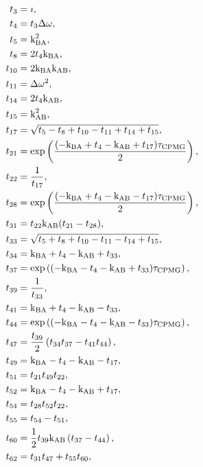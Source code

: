 \begin{subequations}
\renewcommand{\theequation}{\theparentequation .\arabic{equation}}
\begin{align}
      t_{3} &= \imath, \\
      t_{4} &= t_{3} \dw, \\
      t_{5} &= \kBA^2, \\
      t_{8} &= 2 t_{4} \kBA, \\
     t_{10} &= 2 \kBA \kAB, \\
     t_{11} &= \dw^2, \\
     t_{14} &= 2 t_{4} \kAB, \\
     t_{15} &= \kAB^2, \\
     t_{17} &= \sqrt{t_{5} - t_{8} + t_{10} - t_{11} + t_{14} + t_{15}}, \\
     t_{21} &= \exp \left(\frac{(-\kBA + t_{4} - \kAB + t_{17}) \taucpmg}{2} \right), \\
     t_{22} &= \frac{1}{t_{17}}, \\
     t_{28} &= \exp \left(\frac{(-\kBA + t_{4} - \kAB - t_{17}) \taucpmg}{2} \right), \\
     t_{31} &= t_{22} \kAB (t_{21} - t_{28}), \\
     t_{33} &= \sqrt{t_{5} + t_{8} + t_{10} - t_{11} - t_{14} + t_{15}}, \\
     t_{34} &= \kBA + t_{4} - \kAB + t_{33}, \\
     t_{37} &= \exp \left((-\kBA - t_{4} - \kAB + t_{33}) \taucpmg \right), \\
     t_{39} &= \frac{1}{t_{33}}, \\
     t_{41} &= \kBA + t_{4} - \kAB - t_{33}, \\
     t_{44} &= \exp \left((-\kBA - t_{4} - \kAB - t_{33}) \taucpmg \right), \\
     t_{47} &= \frac{t_{39}}{2} \left(t_{34} t_{37} - t_{41} t_{44} \right), \\
     t_{49} &= \kBA - t_{4} - \kAB - t_{17}, \\
     t_{51} &= t_{21} t_{49} t_{22}, \\
     t_{52} &= \kBA - t_{4} - \kAB + t_{17}, \\
     t_{54} &= t_{28} t_{52} t_{22}, \\
     t_{55} &= t_{54} - t_{51}, \\
     t_{60} &= \frac{1}{2} t_{39} \kAB \left(t_{37} - t_{44} \right), \\
     t_{62} &= t_{31} t_{47} + t_{55} t_{60}, \\

\end{align}
\end{subequations}
